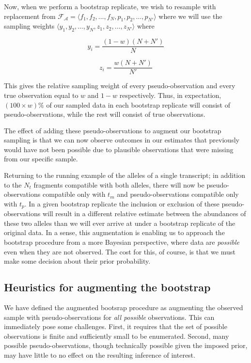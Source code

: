 Now, when we perform a bootstrap replicate, we wish to resample with replacement from 
$\mathcal{F_{A}} = \langle f_1, f_2, \dots, f_N, p_1, p_2, \dots, p_{N'} \rangle$ where we will use 
the sampling weights $\langle y_1, y_2, \dots, y_N, z_1, z_2, \dots, z_{N'}\rangle$ where 

$$
y_i = \frac{(1-w) (N+N')}{N}
$$


$$
z_i = \frac{w (N+N')}{N'}
$$

This gives the relative sampling weight of every pseudo-observation and every true observation
equal to $w$ and $1-w$ respectively. Thus, in expectation, $(100 \times w)\%$ of our sampled data 
in each bootstrap replicate will consist of pseudo-observations, while the rest will consist of 
true observations.

The effect of adding these pseudo-observations to augment our bootstrap sampling is that we can now 
observe outcomes in our estimates that previously would have not been possible due to plausible 
observations that were missing from our specific sample.

Returning to the running example of the alleles of a single transcript; in addition to the $N_t$ 
fragments compatible with both alleles, there will now be pseudo-observations compatible only with 
$t_m$ and pseudo-observations compatible only with $t_p$.  In a given bootstrap replicate the 
inclusion or exclusion of these pseudo-observations will result in a different relative estimate 
between the abundances of these two alleles than we will ever arrive at under a bootstrap replicate 
of the original data.  In a sense, this augmentation is enabling us to approach the bootstrap 
procedure from a more Bayesian perspective, where data are \textit{possible} even when they are not 
observed.  The cost for this, of course, is that we must make some decision about their prior probability.

\subsection{Heuristics for augmenting the bootstrap}

We have defined the augmented bootsrap procedure as augmenting the observed sample with 
pseudo-observations for \textit{all possible} observations. This can immediately pose some challenges. 
First, it requires that the set of possible observations is finite and sufficiently small to be 
enumerated.  Second, many possible pseudo-observations, though technically possible given the 
imposed prior, may have little to no effect on the resulting inference of interest.

